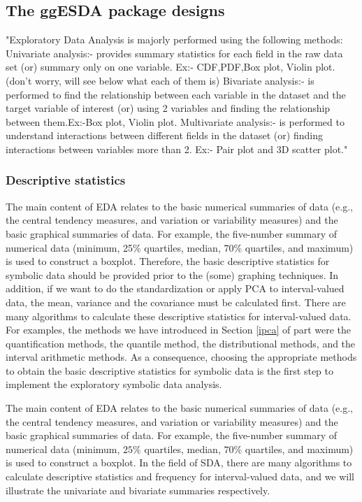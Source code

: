 \documentclass[article]{jss}
\begin{document}
\subsection{The ggESDA package designs}
"Exploratory Data Analysis is majorly performed using the following methods:
Univariate analysis:- provides summary statistics for each field in the raw data set (or) summary only on one variable. Ex:- CDF,PDF,Box plot, Violin plot.(don't worry, will see below what each of them is)
Bivariate analysis:- is performed to find the relationship between each variable in the dataset and the target variable of interest (or) using 2 variables and finding the relationship between them.Ex:-Box plot, Violin plot.
Multivariate analysis:- is performed to understand interactions between different fields in the dataset (or) finding interactions between variables more than 2. Ex:- Pair plot and 3D scatter plot."




\subsubsection{Descriptive statistics}
The main content of EDA relates to the basic numerical summaries of
data (e.g., the central tendency measures, and variation or
variability measures) and the basic graphical summaries of data. For
example, the five-number summary of numerical data (minimum, 25\%
quartiles, median, 70\% quartiles, and maximum) is used to construct a
boxplot. Therefore, the basic descriptive statistics for symbolic data
should be provided prior to the (some) graphing techniques. In
addition, if we want to do the standardization or apply PCA to
interval-valued data, the mean, variance and the covariance must be
calculated first. There are many algorithms to calculate these
descriptive statistics for interval-valued data. For examples, the
methods we have introduced in Section \ref{ipca} of part were the
quantification methods, the quantile method, the distributional
methods, and the interval arithmetic methods. As a consequence,
choosing the appropriate methods to obtain the basic descriptive
statistics for symbolic data is the first step to implement the
exploratory symbolic data analysis.


The main content of EDA relates to the basic numerical summaries of
data (e.g., the central tendency measures, and variation or
variability measures) and the basic graphical summaries of data. For
example, the five-number summary of numerical data (minimum, $25\%$
quartiles, median, $70\%$ quartiles, and maximum) is used to construct
a boxplot. In the field of SDA, there are many algorithms to calculate
descriptive statistics and frequency for interval-valued data, and we
will illustrate the univariate and bivariate summaries respectively.
\end{document}
